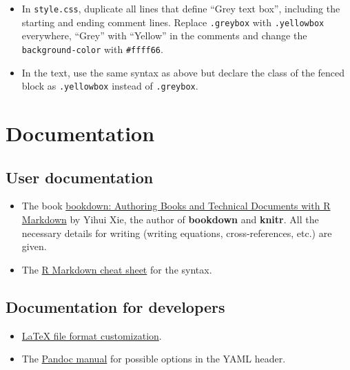 \documentclass[
  12pt,
  american,
  a4paper,
  extrafontsizes,onecolumn,openright
  ]{memoir}
\providecommand{\tightlist}{%
  \setlength{\itemsep}{0pt}\setlength{\parskip}{0pt}}
\begin{document}
\begin{itemize}
\tightlist
\item
  In \texttt{style.css}, duplicate all lines that define \enquote{Grey text box}, including the starting and ending comment lines.
  Replace \texttt{.greybox} with \texttt{.yellowbox} everywhere, \enquote{Grey} with \enquote{Yellow} in the comments and change the \texttt{background-color} with \texttt{\#ffff66}.
\item
  In the text, use the same syntax as above but declare the class of the fenced block as \texttt{.yellowbox} instead of \texttt{.greybox}.
\end{itemize}

\hypertarget{documentation}{%
\section{Documentation}\label{documentation}}

\hypertarget{user-documentation}{%
\subsection{User documentation}\label{user-documentation}}

\begin{itemize}
\tightlist
\item
  The book \href{https://bookdown.org/yihui/bookdown/}{bookdown: Authoring Books and Technical Documents with R Markdown} by Yihui Xie, the author of \textbf{bookdown} and \textbf{knitr}.
  All the necessary details for writing (writing equations, cross-references, etc.) are given.
\item
  The \href{https://www.rstudio.com/wp-content/uploads/2015/02/rmarkdown-cheatsheet.pdf}{R Markdown cheat sheet} for the syntax.
\end{itemize}

\hypertarget{documentation-for-developers}{%
\subsection{Documentation for developers}\label{documentation-for-developers}}

\begin{itemize}
\tightlist
\item
  \href{http://rmarkdown.rstudio.com/pdf_document_format.html\#advanced_customization}{LaTeX file format customization}.
\item
  The \href{https://pandoc.org/MANUAL.html}{Pandoc manual} for possible options in the YAML header.
\end{itemize}
\end{document}
